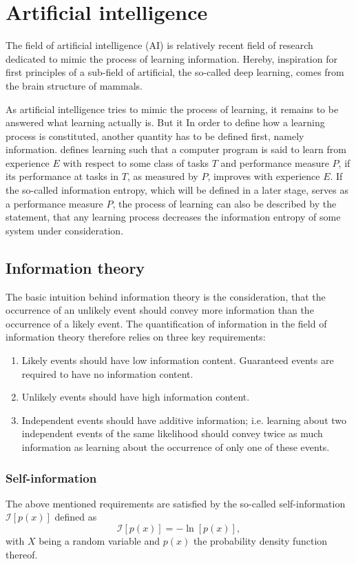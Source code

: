 \documentclass[a4paper,12pt]{report}
\begin{document}
\chapter{Artificial intelligence}
The field of artificial intelligence (AI) is relatively recent field of research dedicated to mimic the process of learning information. Hereby, inspiration for first principles of a sub-field of artificial, the so-called deep learning, comes from the brain structure of mammals. 

As artificial intelligence tries to mimic the process of learning, it remains to be answered what learning actually is. But it In order to define how a learning process is constituted, another quantity has to be defined first, namely information. \cite[p.2]{Mitchell.1997} defines learning such that a computer program is said to learn from experience $E$ with respect to some class of tasks $T$ and performance measure $P$, if its performance at tasks in $T$, as measured by $P$, improves with experience $E$. If the so-called information entropy, which will be defined in a later stage, serves as a performance measure $P$, the process of learning can also be described by the statement, that any learning process decreases the information entropy of some system under consideration.

\section{Information theory}
The basic intuition behind information theory is the consideration, that the occurrence of an unlikely event should convey more information than the occurrence of a likely event. The quantification of information in the field of information theory therefore relies on three key requirements:
\begin{enumerate}
\item Likely events should have low information content. Guaranteed events are required to have no information content.
\item Unlikely events should have high information content.
\item Independent events should have additive information; i.e. learning about two independent events of the same likelihood should convey twice as much information as learning about the occurrence of only one of these events.
\end{enumerate} %

\subsection{Self-information}
The above mentioned requirements are satisfied by the so-called self-information $\mathcal{I}[p(x)]$ defined as \begin{equation}\label{eq:defselfinformation}
\mathcal{I}[p(x)] = -\ln\left[p(x)\right],
\end{equation} with $X$ being a random variable and $p(x)$ the probability density function thereof.
\end{document}
